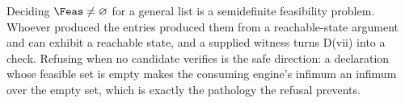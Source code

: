 
\begin{remark}\label{rem:nosearch}
Deciding $\Feas\ne\varnothing$ for a general list is a semidefinite
feasibility problem. Whoever produced the entries produced them from a
reachable-state argument and can exhibit a reachable state, and a supplied
witness turns D(vii) into a check. Refusing when no candidate verifies is the
safe direction: a declaration whose feasible set is empty makes the consuming
engine's infimum an infimum over the empty set, which is exactly the pathology
the refusal prevents.
\end{remark}
